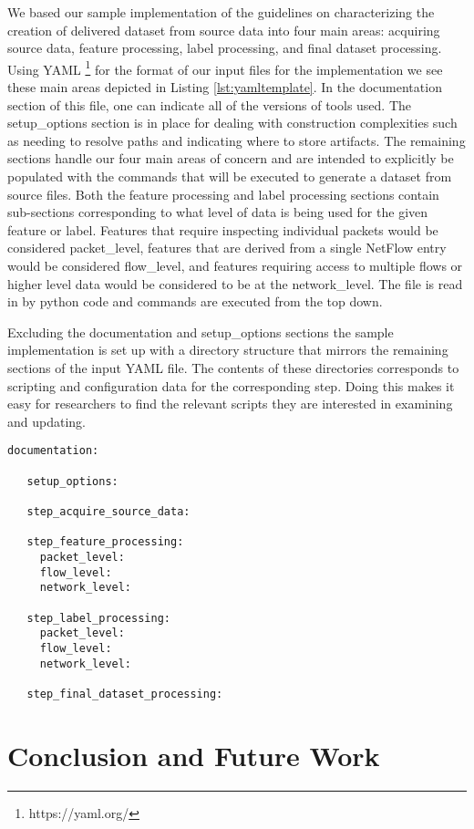 \documentclass[conference]{IEEEtran}
\begin{document}
We based our sample implementation of the guidelines on characterizing the creation of delivered dataset from source data into four main areas:  acquiring source data, feature processing, label processing, and final dataset processing.
Using YAML \footnote{https://yaml.org/} for the format of our input files for the implementation we see these main areas depicted in Listing \ref{lst:yamltemplate}.
In the documentation section of this file, one can indicate all of the versions of tools used.
The setup\_options section is in place for dealing with construction complexities such as needing to resolve paths and indicating where to store artifacts.
The remaining sections handle our four main areas of concern and are intended to explicitly be populated with the commands that will be executed to generate a dataset from source files.
Both the feature processing and label processing sections contain sub-sections corresponding to what level of data is being used for the given feature or label.
Features that require inspecting individual packets would be considered packet\_level, features that are derived from a single NetFlow entry would be considered flow\_level, and features requiring access to multiple flows or higher level data would be considered to be at the network\_level.
The file is read in by python code and commands are executed from the top down.

Excluding the documentation and setup\_options sections the sample implementation is set up with a directory structure that mirrors the remaining sections of the input YAML file.
The contents of these directories corresponds to scripting and configuration data for the corresponding step.
Doing this makes it easy for researchers to find the relevant scripts they are interested in examining and updating.

\begin{lstlisting}[label=lst:yamltemplate, caption={A template input file for our sample guidelines implementation.  Each section would be filled in with either information or explicit commands that get run.}, captionpos=b, basicstyle=\footnotesize, backgroundcolor=\color{gray!10!white}, frame=stb]
   documentation:
   
   setup_options:
   
   step_acquire_source_data:
   
   step_feature_processing:
     packet_level:
     flow_level:
     network_level:
   
   step_label_processing:
     packet_level:
     flow_level:
     network_level:
   
   step_final_dataset_processing:
\end{lstlisting}

\section{Conclusion and Future Work}\label{sec:conclusion}



\end{document}
